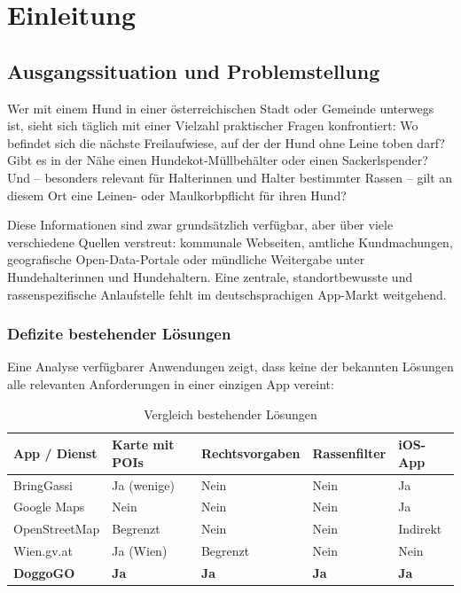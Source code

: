 \chapter{Einleitung}
\label{chap:einleitung}

\section{Ausgangssituation und Problemstellung}
\label{sec:ausgangssituation}

Wer mit einem Hund in einer österreichischen Stadt oder Gemeinde unterwegs ist, sieht sich
täglich mit einer Vielzahl praktischer Fragen konfrontiert: Wo befindet sich die nächste
Freilaufwiese, auf der der Hund ohne Leine toben darf? Gibt es in der Nähe einen
Hundekot-Müllbehälter oder einen Sackerlspender? Und – besonders relevant für Halter\-innen
und Halter bestimmter Rassen – gilt an diesem Ort eine Leinen- oder Maulkorbpflicht für
ihren Hund?

Diese Informationen sind zwar grundsätzlich verfügbar, aber über viele verschiedene Quellen
verstreut: kommunale Webseiten, amtliche Kundmachungen, geografische Open-Data-Portale oder
mündliche Weitergabe unter Hundehalter\-innen und Hundehaltern. Eine zentrale, standortbewusste
und rassenspezifische Anlaufstelle fehlt im deutschsprachigen App-Markt weitgehend.

\subsection{Defizite bestehender Lösungen}
\label{subsec:defizite}

Eine Analyse verfügbarer Anwendungen zeigt, dass keine der bekannten Lösungen alle
relevanten Anforderungen in einer einzigen App vereint:

\begin{table}[H]
  \centering
  \caption{Vergleich bestehender Lösungen}
  \label{tab:konkurrenzanalyse}
  \small
  \begin{tabularx}{\textwidth}{|p{2.5cm}|Y|p{3.1cm}|p{2.4cm}|Y|}
    \hline
    \textbf{App / Dienst} & \textbf{Karte mit POIs} & \textbf{Rechtsvorgaben} &
    \textbf{Rassenfilter} & \textbf{iOS-App} \\
    \hline
    BringGassi       & Ja (wenige) & Nein & Nein & Ja \\
    \hline
    Google Maps      & Nein        & Nein & Nein & Ja \\
    \hline
    Open\-Street\-Map & Begrenzt   & Nein & Nein & Indirekt \\
    \hline
    Wien.gv.at       & Ja (Wien)   & Begrenzt & Nein & Nein \\
    \hline
    \textbf{DoggoGO} & \textbf{Ja} & \textbf{Ja} & \textbf{Ja} & \textbf{Ja} \\
    \hline
  \end{tabularx}
\end{table}

